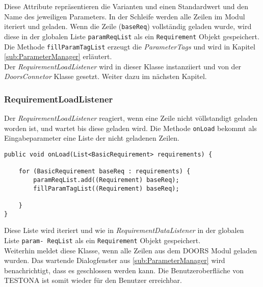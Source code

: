 Diese Attribute repräsentieren die Varianten und einen Standardwert und den Name des jeweiligen Parameters. In der Schleife werden alle Zeilen im Modul iteriert und geladen. Wenn die Zeile (\texttt{baseReq}) vollständig geladen wurde, wird diese in der globalen Liste \texttt{paramReqList} als ein \texttt{Requirement} Objekt gespeichert. Die Methode \texttt{fillParamTagList} erzeugt die \textit{ParameterTags} und wird in Kapitel \ref{sub:ParameterManager} erläutert.\\

Der \textit{RequirementLoadListener} wird in dieser Klasse instanziiert und von der \textit{DoorsConnetor} Klasse gesetzt. Weiter dazu im nächsten Kapitel.


\subsubsection{RequirementLoadListener}\label{sub.RequirementLoadListener}
Der \textit{RequirementLoadListener} reagiert, wenn eine Zeile nicht völlstandigt geladen worden ist, und wartet bis diese geladen wird. Die Methode \texttt{onLoad} bekommt als Eingabeparameter eine Liste der nicht geladenen Zeilen.

\begin{lstlisting}[caption={Nachladen der Parametertabelle nach Zeilen}, captionpos=b]
public void onLoad(List<BasicRequirement> requirements) {

	for (BasicRequirement baseReq : requirements) {
		paramReqList.add((Requirement) baseReq);
		fillParamTagList((Requirement) baseReq);
		
	}
}
\end{lstlisting}

Diese Liste wird iteriert und wie in \textit{RequirementDataListener} in der globalen Liste \texttt{param- ReqList} als ein \texttt{Requirement} Objekt gespeichert.\\

Weiterhin meldet diese Klasse, wenn alle Zeilen aus dem DOORS Modul geladen wurden. Das wartende Dialogfenster aus \ref{sub:ParameterManager} wird benachrichtigt, dass es geschlossen werden kann. Die Benutzeroberfläche von TESTONA ist somit wieder für den Benutzer erreichbar.



\newpage
